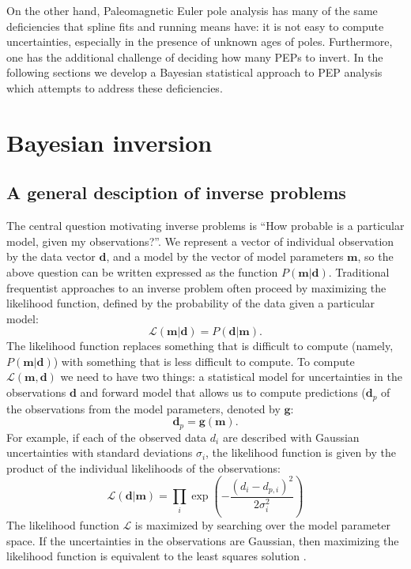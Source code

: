 \documentclass[preprint,12pt,authoryear]{elsarticle}
\begin{document}
On the other hand, Paleomagnetic Euler pole analysis has many of the same
deficiencies that spline fits and running means have: it is not easy to compute
uncertainties, especially in the presence of unknown ages of poles.
Furthermore, one has the additional challenge of deciding how many PEPs to invert.
In the following sections we develop a Bayesian statistical approach to
PEP analysis which attempts to address these deficiencies.

\section{Bayesian inversion}
\label{sec:bayesian_inversion}
\subsection{A general desciption of inverse problems}
\label{sec:intro_inverse_problems}
The central question motivating inverse problems is ``How probable is a particular model, given my observations?''.
We represent a vector of individual observation by the data vector $\mathbf{d}$, and a model
by the vector of model parameters $\mathbf{m}$, so the above question can be written expressed as the function $P(\mathbf{m} \vert \mathbf{d})$.
Traditional frequentist approaches to an inverse problem often proceed by maximizing the likelihood function,
defined by the probability of the data given a particular model:
\begin{equation}
\mathcal{L} ( \mathbf{m} \vert \mathbf{d} ) = P( \mathbf{d} \vert \mathbf{m} ).
\label{eq:likelihood}
\end{equation}
The likelihood function replaces something that is difficult to compute (namely, $P(\mathbf{m} \vert \mathbf{d})$)
with something that is less difficult to compute. 
To compute $\mathcal{L}(\mathbf{m}, \mathbf{d})$ we need to have two things: a statistical model for 
uncertainties in the observations $\mathbf{d}$ and forward model that allows us to compute
predictions ($\mathbf{d}_p$ of the observations from the model parameters, denoted by $\mathbf{g}$:
\begin{equation}
\mathbf{d}_p = \mathbf{g}(\mathbf{m}).
\label{eq:forward}
\end{equation}
For example, if each of the observed data $d_i$ are described with Gaussian uncertainties
with standard deviations $\sigma_i$, the likelihood function is given by the product
of the individual likelihoods of the observations:
\begin{equation}
\mathcal{L}(\mathbf{d} | \mathbf{m} ) = \displaystyle\prod_i \exp\left({-\frac{(d_i - d_{p,i})^2}{2 \sigma_i^2}}\right)
\label{eq:example_likelihood}
\end{equation}
The likelihood function $\mathcal{L}$ is maximized by searching over the model parameter space.
If the uncertainties in the observations are Gaussian, then maximizing the likelihood function is
equivalent to the least squares solution \citep{aster2005parameter}.
\end{document}
